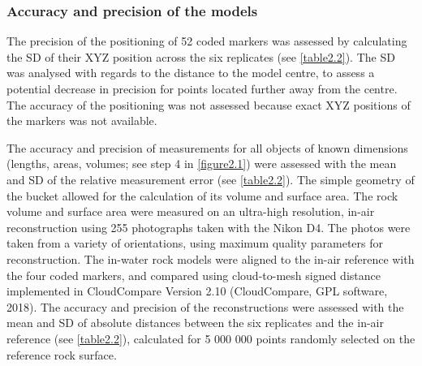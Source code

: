 \subsubsection{Accuracy and precision of the models}\label{chapitre2_2.3.3}
The precision of the positioning of 52 coded markers was assessed by calculating the SD of their XYZ position across the six replicates (see \autoref{table2.2}). The SD was analysed with regards to the distance to the model centre, to assess a potential decrease in precision for points located further away from the centre. The accuracy of the positioning was not assessed because exact XYZ positions of the markers was not available.

The accuracy and precision of measurements for all objects of known dimensions (lengths, areas, volumes; see step 4 in \autoref{figure2.1}) were assessed with the mean and SD of the relative measurement error (see \autoref{table2.2}). The simple geometry of the bucket allowed for the calculation of its volume and surface area. The rock volume and surface area were measured on an ultra-high resolution, in-air reconstruction \citep{bryson_characterization_2017} using 255 photographs taken with the Nikon D4. The photos were taken from a variety of orientations, using maximum quality parameters for reconstruction. The in-water rock models were aligned to the in-air reference with the four coded markers, and compared using cloud-to-mesh signed distance implemented in CloudCompare Version 2.10 (CloudCompare, GPL software, 2018). The accuracy and precision of the reconstructions were assessed with the mean and SD of absolute distances between the six replicates and the in-air reference (see \autoref{table2.2}), calculated for 5 000 000 points randomly selected on the reference rock surface.

